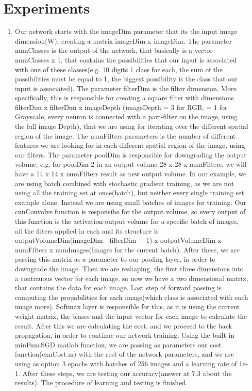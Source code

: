 \documentclass{article}
\begin{document}
\section{Experiments}
\begin{enumerate}
\item Our network starts with the imageDim parameter that its the input image dimension(W), creating a matrix imageDim x imageDim. The parameter numClasses is the output of the network, that basically is a vector numClasses x 1, that contains the possibilities that our input is associated with one of these classes(e.g. 10 digits 1 class for each, the sum of the possibilities must be equal to 1, the biggest possibility is the class that our input is associated). The parameter filterDim is the filter dimension. More specifically, this is responsible for creating a square filter with dimensions filterDim x filterDim x imageDepth (imageDepth = 3 for RGB, = 1 for Grayscale, every neuron is connected with a part-filter on the image, using the full image Depth), that we are using for iterating over the different spatial region of the image. The numFilters parameters is the number of different features we are looking for in each different spatial region of the image, using our filters. The parameter poolDim is responsible for downgrading the output volume, e.g. for poolDim 2 in an output volume 28 x 28 x numFilters, we will have a 14 x 14 x numFilters result as new output volume. In our example, we are using batch combined with stochastic gradient training, as we are not using all the training set at once(batch), but neither every single training set example alone. Instead we are using small batches of images for training. Our cnnConvolve function is responsibe for the output volume, so every output of this function is the activation-output volume for a specific batch of images, all the filters applied in each and its structure is outputVolumeDim(imageDim - filterDim + 1) x outputVolumeDim x numFilters x numImages(Images for the current batch). After these, we are passing this matrix as a parameter to our pooling layer, in order to downgrade the image. Then we are reshaping, the first three dimensions into a continuous vector for each image, so now we have a two dimensional matrix, that contains the data for each image. Last step of forward passing is computing the propabilities for each image(which class is associated with each image more). Softmax layer is responsible for this, as it is using the current weight matrix, the biases and the input vector for each image to calculate the result. After this we are calculating the cost, and we proceed to the back propagation, in order to continue our network training. Using the built-in minFuncSGD matlab function, we are passing as parameters our cost function(cnnCost.m) with the rest of the network parameters, and we are using as option 3 epochs with batches of 256 images and a learning rate of 1e-1. After these steps, we are testing our accuracy(answer at 7.3 about the results). The procedure of learning and testing is finished.

\end{enumerate}
\end{document}
